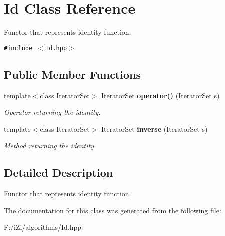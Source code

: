 \section{Id Class Reference}
\label{class_id}
Functor that represents identity function.  


{\tt \#include $<$Id.hpp$>$}

\subsection*{Public Member Functions}
\begin{CompactItemize}
\item 
template$<$class Iterator\-Set$>$ Iterator\-Set {\bf operator()} (Iterator\-Set s)\label{class_id_7aea166dc5d92a9f25a2f27bde72898d}

\begin{CompactList}\small\item\em Operator returning the identity. \item\end{CompactList}\item 
template$<$class Iterator\-Set$>$ Iterator\-Set {\bf inverse} (Iterator\-Set s)\label{class_id_a1bfcb19aff95428c2f8ec4ea8043eea}

\begin{CompactList}\small\item\em Method returning the identity. \item\end{CompactList}\end{CompactItemize}


\subsection{Detailed Description}
Functor that represents identity function. 



The documentation for this class was generated from the following file:\begin{CompactItemize}
\item 
F:/i\-Zi/algorithms/Id.hpp\end{CompactItemize}
